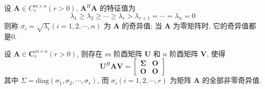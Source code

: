 \par 设 $\bm{A} \in C^{m\times n}_r (r > 0)$, $\bm{A}^H\bm{A}$ 的特征值为
$$
    \lambda_1 \geqslant \lambda_2 \geqslant \cdots \geqslant \lambda_r > \lambda_{r + 1} = \cdots = \lambda_n = 0
$$
则称 $\sigma_i = \sqrt{\lambda_i}(i =1,2,\cdots,n)$ 为 $\bm{A}$ 的奇异值; 当 $\bm{A}$ 为零矩阵时, 它的奇异值都是0.

\par 设 $\bm{A} \in \bm{C}^{m\times n}_r(r > 0)$, 则存在 $m$ 阶酉矩阵 $\bm{U}$ 和 $n$ 阶酉矩阵 $\bm{V}$, 使得
$$
    \bm{U}^H\bm{AV} = \begin{bmatrix}
        \bm{\Sigma} & \bm{O} \\
        \bm{O}      & \bm{O}
    \end{bmatrix}
$$
其中 $\Sigma = \mathrm{diag}(\sigma_1, \sigma_2, \cdots, \sigma_r)$, 而 $\sigma_i(i = 1,2,\cdots,r)$ 为矩阵 $\bm{A}$ 的全部非零奇异值.

